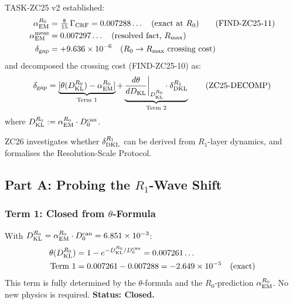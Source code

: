 \documentclass[12pt, a4paper]{article}
\begin{document}
TASK-ZC25 v2 established:
\begin{align}
  \alpha_{\rm EM}^{R_0}  &= \tfrac{8}{15}\,\Gamma_{\rm CRF}
    = 0.007288\ldots \quad \text{(exact at }R_0\text{)}
    \tag{FIND-ZC25-11} \\
  \alpha_{\rm EM}^{\rm meas} &= 0.007297\ldots
    \quad \text{(resolved fact, }R_{\max}\text{)} \\
  \delta_{\rm gap} &= +9.636\times10^{-6}
    \quad \text{(}R_0\to R_{\max}\text{ crossing cost)}
\end{align}
and decomposed the crossing cost (FIND-ZC25-10) as:
\begin{equation}
  \delta_{\rm gap}
  = \underbrace{[\theta(D_{\rm KL}^{R_0}) - \alpha_{\rm EM}^{R_0}]}_{\text{Term~1}}
  + \underbrace{\frac{d\theta}{dD_{\rm KL}}\bigg|_{D_{\rm KL}^{R_0}}
    \cdot\delta_{\rm DKL}^{R_1}}_{\text{Term~2}}
  \tag{ZC25-DECOMP}\label{zc26:eq:decomp}
\end{equation}
where $D_{\rm KL}^{R_0} := \alpha_{\rm EM}^{R_0}\cdot D_0^{\rm can}$.

ZC26 investigates whether $\delta_{\rm DKL}^{R_1}$ can be derived
from $R_1$-layer dynamics, and formalises the Resolution-Scale
Protocol.

\subsection{Part A: Probing the $R_1$-Wave Shift}
\label{zc26:sec:probe}

\subsubsection{Term 1: Closed from $\theta$-Formula}

\begin{derivedbox}[title={FIND-ZC26-04: Term~1 is Closed}]
With $D_{\rm KL}^{R_0} = \alpha_{\rm EM}^{R_0}\cdot D_0^{\rm can}
= 6.851\times10^{-3}$:
\begin{align}
  \theta(D_{\rm KL}^{R_0})
    &= 1 - e^{-D_{\rm KL}^{R_0}/D_0^{\rm can}}
     = 0.007261\ldots \\
  \text{Term~1}
    &= 0.007261 - 0.007288
     = -2.649\times10^{-5} \quad \text{(exact)}
\end{align}
This term is fully determined by the $\theta$-formula and
the $R_0$-prediction $\alpha_{\rm EM}^{R_0}$.
No new physics is required. \textbf{Status: Closed.}
\end{derivedbox}
\end{document}
